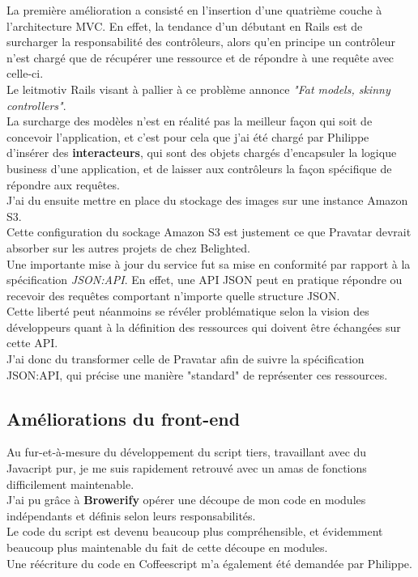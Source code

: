 \documentclass{report}
\begin{document}
      La première amélioration a consisté en l'insertion d'une quatrième couche à l'architecture MVC. En effet, la tendance d'un débutant en Rails est de surcharger la responsabilité des contrôleurs, alors qu'en
      principe un contrôleur n'est chargé que de récupérer une ressource et de répondre à une requête avec celle-ci.\\
      Le leitmotiv Rails visant à pallier à ce problème annonce \textit{"Fat models, skinny controllers"}.\\
      La surcharge des modèles n'est en réalité pas la meilleur façon qui soit de concevoir l'application, et c'est pour cela que j'ai été chargé par Philippe d'insérer des \textbf{interacteurs}, qui sont des
      objets chargés d'encapsuler la logique business d'une application, et de laisser aux contrôleurs la façon spécifique de répondre aux requêtes.\\

      J'ai du ensuite mettre en place du stockage des images sur une instance Amazon S3.\\
      Cette configuration du sockage Amazon S3 est justement ce que Pravatar devrait absorber sur les autres projets de chez Belighted.\\

      Une importante mise à jour du service fut sa mise en conformité par rapport à la spécification \textit{JSON:API}. En effet, une API JSON peut en pratique répondre ou recevoir des requêtes
      comportant n'importe quelle structure JSON.\\
      Cette liberté peut néanmoins se révéler problématique selon la vision des développeurs quant à la définition des ressources qui doivent être échangées sur cette API.\\
      J'ai donc du transformer celle de Pravatar afin de suivre la spécification JSON:API, qui précise une manière "standard" de représenter ces ressources.\\

    \subsection{Améliorations du front-end}
    \label{sub:Améliorations du front-end}

      Au fur-et-à-mesure du développement du script tiers, travaillant avec du Javacript pur, je me suis rapidement retrouvé avec un amas de fonctions difficilement maintenable.\\
      J'ai pu grâce à \textbf{Browerify} opérer une découpe de mon code en modules indépendants et définis selon leurs responsabilités.\\
      Le code du script est devenu beaucoup plus compréhensible, et évidemment beaucoup plus maintenable du fait de cette découpe en modules.\\
      Une réécriture du code en Coffeescript m'a également été demandée par Philippe.
\end{document}

